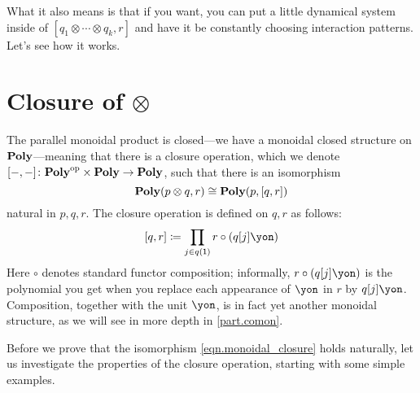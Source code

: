 \documentclass[Book-Poly]{subfiles}
\begin{document}
What it also means is that if you want, you can put a little dynamical system inside of $[q_1\otimes\cdots\otimes q_k,r]$ and have it be constantly choosing interaction patterns. Let's see how it works.


\section{Closure of $\otimes$}%

The parallel monoidal product is closed---we have a monoidal closed structure on $\mathbf{Poly}$---meaning that there is a closure operation, which we denote $[-,-]\colon\mathbf{Poly}^{\textnormal{op}}\times\mathbf{Poly}\to\mathbf{Poly}$, such that there is an isomorphism
\begin{equation}\label{eqn.monoidal_closure}
  \mathbf{Poly}(p\otimes q,r) \cong \mathbf{Poly}(p,[q,r])
\end{equation}
natural in $p,q,r$.
The closure operation is defined on $q,r$ as follows:
\begin{equation}\label{eqn.dir_hom}
	\ihom{q,r} \coloneqq \prod_{j\in q(\1)}r\circ(q[j]\yon)
\end{equation}
Here $\circ$ denotes standard functor composition; informally, $r \circ (q[j]\yon)$ is the polynomial you get when you replace each appearance of $\yon$ in $r$ by $q[j]\yon$.
Composition, together with the unit $\yon$, is in fact yet another monoidal structure, as we will see in more depth in \cref{part.comon}.

Before we prove that the isomorphism \eqref{eqn.monoidal_closure} holds naturally, let us investigate the properties of the closure operation, starting with some simple examples.
\end{document}
